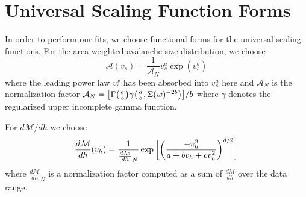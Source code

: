 \documentclass[reprint,amsmath,amssymb,aps,floatfix]{revtex4-1}
\begin{document}
\section{\label{app:universal} Universal Scaling Function Forms}
In order to perform our fits, we choose functional forms for the universal scaling functions. For the area weighted avalanche size distribution, we choose 
%
\begin{equation}
	\label{eqn:univA}
	\mathcal{A}(v_s) = \frac{1}{\mathcal{A}_N}v_s^a\exp(v_s^b)
\end{equation}
%
\noindent where the leading power law $v_s^x$ has been absorbed into $v_s^a$ here and $\mathcal{A}_N$ is the normalization factor $\mathcal{A}_N = \big{[}\Gamma\big{(}\frac{a}{b}\big{)}\gamma\big{(}\frac{a}{b}, \Sigma(w)^{-2b}\big{)}\big{]}/b$ where $\gamma$ denotes the regularized upper incomplete gamma function. \par
%
For $d\mathcal{M}/dh$ we choose
%
\begin{equation}
	\frac{d\mathcal{M}}{dh}(v_h)=   \frac{1}{\frac{d\mathcal{M}}{dh}_{N}} \exp\bigg{[}\bigg{(}\frac{-v_h^2}{a+b v_h+c v_h^2}\bigg{)}^{d/2}\bigg{]}
\end{equation}
%
\noindent where $\frac{d\mathcal{M}}{dh}_{N}$ is a normalization factor computed as a sum of $\frac{dM}{dh}$ over the data range. 
\end{document}
